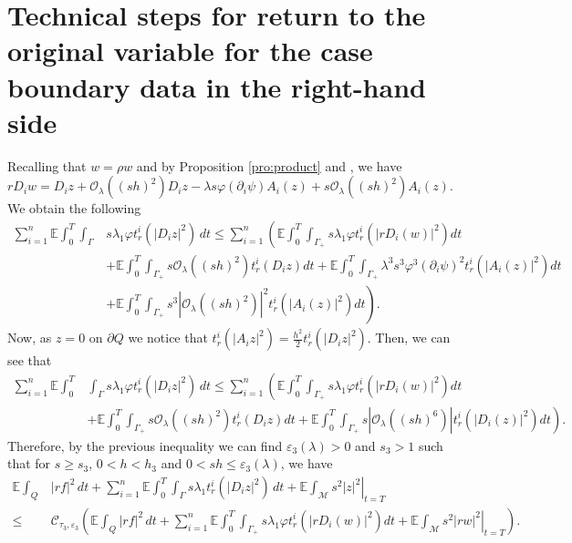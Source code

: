 \documentclass[11pt,oneside,leqno]{amsart}
\numberwithin{equation}{section}
\numberwithin{equation}{section}
\newcommand{\E}{\mathbb{E}}
\begin{document}
{ 
\section{Technical steps for return to the original variable for the case boundary data in the right-hand side}\label{appendix:additionalreturn}
Recalling that $w=\rho w$ and by Proposition \ref{pro:product} and \cite[Lemma 3.7]{BHLR:2010b}, we have $rD_iw=D_iz+\mathcal{O}_{\lambda}((sh)^2)D_iz-\lambda s\varphi(\partial_i\psi)A_i(z)+s\mathcal{O}_{\lambda}((sh)^2)A_i(z) $. We obtain the following
\begin{align*}
     \sum_{i=1}^{n}\E\int_0^T\int_{\Gamma}&s\lambda_{1}\varphi t_{r}^{i}(|D_iz|^2)\,dt\leq\sum_{i=1}^{n}\left(\E\int_0^T\int_{\Gamma_{+}}s\lambda_{1}\varphi t_{r}^{i}(|rD_i(w)|^2)dt\right.\\
     &\left.+\E\int_0^T\int_{\Gamma_+} s\mathcal{O}_{\lambda}((sh)^2)t_r^i(D_iz)dt+\E\int_0^T\int_{\Gamma_+}\lambda^3 s^3\varphi^3(\partial_i\psi)^2t_r^i(|A_i(z)|^2)dt\right.\\
     &\left.+\E\int_0^T\int_{\Gamma_+}s^3|\mathcal{O}_{\lambda}((sh)^2)|^2 t_r^i(|A_i(z)|^2)dt\right).
\end{align*}
Now, as $z=0$ on $\partial Q$ we notice that $t_r^i(|A_iz|^2)=\frac{h^2}{2}t_r^i(|D_iz|^2)$. Then, we can see that
\begin{align*}
     \sum_{i=1}^{n}\E\int_0^T&\int_{\Gamma}s\lambda_{1}\varphi t_{r}^{i}(|D_iz|^2)\,dt\leq\sum_{i=1}^{n}\left(\E\int_0^T\int_{\Gamma_{+}}s\lambda_{1}\varphi t_{r}^{i}(|rD_i(w)|^2)dt\right.\\
     &\left.+\E\int_0^T\int_{\Gamma_+} s\mathcal{O}_{\lambda}((sh)^2)t_r^i(D_iz)dt+\E\int_0^T\int_{\Gamma_+}s|\mathcal{O}_{\lambda}((sh)^6)| t_r^i(|D_i(z)|^2)dt\right).
\end{align*}
Therefore, by the previous inequality we can find $\varepsilon_3(\lambda)>0$ and $s_3>1$ such that for $s\geq s_3$, $0<h<h_3$ and $0<sh\leq \varepsilon_3(\lambda)$, we have
\begin{align*}
    \E\int_{Q}&|rf|^2\,dt+\sum_{i=1}^{n}\E\int_0^T\int_{\Gamma}s\lambda_{1}t_{r}^{i}(|D_iz|^2)\,dt+\left.\E\int_{\mathcal{M}}s^2|z|^2\right|_{t=T}\\
    \leq&\mathcal{C}_{\tau_3,\varepsilon_3}\left( \E\int_{Q}|rf|^2\,dt+\sum_{i=1}^{n}\E\int_0^T\int_{\Gamma_{+}}s\lambda_{1}\varphi t_{r}^{i}(|rD_i(w)|^2)dt+\left.\E\int_{\mathcal{M}}s^2|rw|^2\right|_{t=T}\right).
\end{align*}
}


\end{document}
